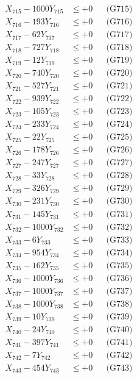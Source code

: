 \documentclass[a4paper,10pt]{article}
\begin{document}
{\begin{align}
X_{715} - 1000Y_{715} &\leq +0 && \text{(G715)} \\
X_{716} - 193Y_{716} &\leq +0 && \text{(G716)} \\
X_{717} - 62Y_{717} &\leq +0 && \text{(G717)} \\
X_{718} - 727Y_{718} &\leq +0 && \text{(G718)} \\
X_{719} - 12Y_{719} &\leq +0 && \text{(G719)} \\
X_{720} - 740Y_{720} &\leq +0 && \text{(G720)} \\
\allowbreak
X_{721} - 527Y_{721} &\leq +0 && \text{(G721)} \\
X_{722} - 939Y_{722} &\leq +0 && \text{(G722)} \\
X_{723} - 105Y_{723} &\leq +0 && \text{(G723)} \\
X_{724} - 233Y_{724} &\leq +0 && \text{(G724)} \\
X_{725} - 22Y_{725} &\leq +0 && \text{(G725)} \\
X_{726} - 178Y_{726} &\leq +0 && \text{(G726)} \\
X_{727} - 247Y_{727} &\leq +0 && \text{(G727)} \\
X_{728} - 33Y_{728} &\leq +0 && \text{(G728)} \\
X_{729} - 326Y_{729} &\leq +0 && \text{(G729)} \\
X_{730} - 231Y_{730} &\leq +0 && \text{(G730)} \\
\allowbreak
X_{731} - 145Y_{731} &\leq +0 && \text{(G731)} \\
X_{732} - 1000Y_{732} &\leq +0 && \text{(G732)} \\
X_{733} - 6Y_{733} &\leq +0 && \text{(G733)} \\
X_{734} - 954Y_{734} &\leq +0 && \text{(G734)} \\
X_{735} - 162Y_{735} &\leq +0 && \text{(G735)} \\
X_{736} - 1000Y_{736} &\leq +0 && \text{(G736)} \\
X_{737} - 1000Y_{737} &\leq +0 && \text{(G737)} \\
X_{738} - 1000Y_{738} &\leq +0 && \text{(G738)} \\
X_{739} - 10Y_{739} &\leq +0 && \text{(G739)} \\
X_{740} - 24Y_{740} &\leq +0 && \text{(G740)} \\
\allowbreak
X_{741} - 397Y_{741} &\leq +0 && \text{(G741)} \\
X_{742} - 7Y_{742} &\leq +0 && \text{(G742)} \\
X_{743} - 454Y_{743} &\leq +0 && \text{(G743)} \\

\end{align}}
\end{document}
